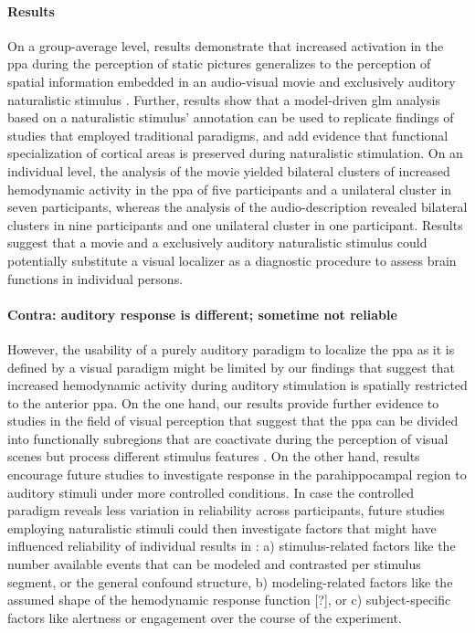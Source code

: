 \paragraph{Results}
On a group-average level, results demonstrate that increased activation in the
\ac{ppa} during the perception of static pictures generalizes to the perception
of spatial information embedded in an audio-visual movie and exclusively
auditory naturalistic stimulus \citep{haeusler2022processing}.
Further, results show that a model-driven \ac{glm} analysis based on a
naturalistic stimulus' annotation can be used to replicate findings of studies
that employed traditional paradigms, and add evidence
\citep[cf.][]{bartels2004mapping} that functional specialization of cortical
areas is preserved during naturalistic stimulation.
On an individual level, the analysis of the movie yielded bilateral clusters of
increased hemodynamic activity in the \ac{ppa} of five participants and a
unilateral cluster in seven participants, whereas the analysis of the
audio-description revealed bilateral clusters in nine participants and one
unilateral cluster in one participant.
Results suggest that a movie and a exclusively auditory naturalistic stimulus
could potentially substitute a visual localizer as a diagnostic procedure to
assess brain functions in individual persons.


\paragraph{Contra: auditory response is different; sometime not reliable}

%
However, the usability of a purely auditory paradigm to localize the \ac{ppa} as
it is defined by a visual paradigm might be limited by our findings that suggest
that increased hemodynamic activity during auditory stimulation is spatially
restricted to the anterior \ac{ppa}.
%
On the one hand, our results provide further evidence to studies in the field of
visual perception that suggest that the \ac{ppa} can be divided into
functionally subregions that are coactivate during the perception of visual
scenes but process different stimulus features
\citep{aminoff2007parahippocampal, baldassano2013differential}.
%
On the other hand, results encourage future studies to investigate response in
the parahippocampal region to auditory stimuli under more controlled conditions.
%
In case the controlled paradigm reveals less variation in reliability across
participants, future studies employing naturalistic stimuli could then
investigate factors that might have influenced reliability of individual results
in \citet{haeusler2022processing}:
%
a) stimulus-related factors like the number available events that can be modeled
and contrasted per stimulus segment, or the general confound structure,
%
b) modeling-related factors like the assumed shape of the hemodynamic response
function [?], or
%
c) subject-specific factors like alertness or engagement over the course of the
experiment.



